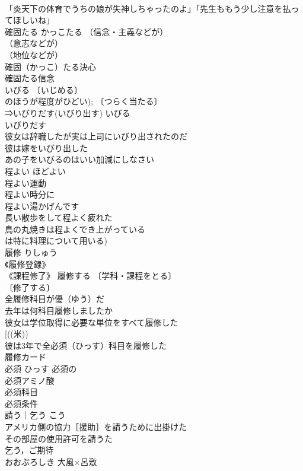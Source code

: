 \documentclass[8pt]{extreport}
\begin{document}
\begin{CJK}{UTF8}{min}
\\	「炎天下の体育でうちの娘が失神しちゃったのよ」「先生ももう少し注意を払ってほしいね」 
\\	確固たる	かっこたる	（信念・主義などが）
\\	（意志などが）
\\	（地位などが）
\\	確固（かっこ）たる決心 
\\	確固たる信念 
\\	いびる		〔いじめる〕
\\	のほうが程度がひどい); 〔つらく当たる〕
\\	⇒いびりだす(いびり出す) いびる　
\\	いびりだす　
\\	彼女は辞職したが実は上司にいびり出されたのだ 
\\	彼は嫁をいびり出した 
\\	あの子をいびるのはいい加減にしなさい 
\\	程よい	ほどよい	
\\	程よい運動 
\\	程よい時分に 
\\	程よい湯かげんです 
\\	長い散歩をして程よく疲れた 
\\	鳥の丸焼きは程よくでき上がっている 
\\	は特に料理について用いる) 
\\	履修	りしゅう	
\\	《履修登録》 
\\	《課程修了》 履修する 〔学科・課程をとる〕
\\	〔修了する〕
\\	全履修科目が優（ゆう）だ 
\\	去年は何科目履修しましたか 
\\	彼女は学位取得に必要な単位をすべて履修した 
\\	[((米))
\\	彼は3年で全必須（ひっす）科目を履修した 
\\	履修カード 
\\	必須	ひっす	必須の 
\\	必須アミノ酸 
\\	必須科目 
\\	必須条件 
\\	請う｜乞う	こう	
\\	アメリカ側の協力［援助］を請うために出掛けた 
\\	その部屋の使用許可を請うた 
\\	乞う，ご期待 
\\	おおぶろしき	大風×呂敷	

\end{CJK}
\end{document}
